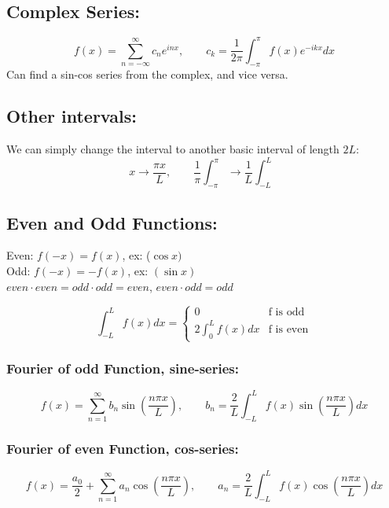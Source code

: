 \documentclass[a4paper,norsk, 10pt]{article}
\begin{document}
\subsection{Complex Series:}
\begin{equation}
f(x) = \sum_{n = -\infty}^{\infty}c_ne^{inx}, \qquad c_k = \frac{1}{2\pi}\int_{-\pi}^{\pi}f(x)e^{-ik x}dx
\end{equation}
Can find a sin-cos series from the complex, and vice versa.

\subsection{Other intervals:}
We can simply change the interval to another basic interval of length $2L$:
\begin{equation}
x\rightarrow \frac{\pi x}{L}, \qquad \frac{1}{\pi}\int_{-\pi}^{\pi} \rightarrow \frac{1}{L}\int_{-L}^{L}
\end{equation}
\subsection{Even and Odd Functions:}
Even: $f(-x) = f(x)$, ex: ($\cos x)$\\
Odd: $f(-x) = -f(x)$, ex: $(\sin x)$\\
$even\cdot even = odd\cdot odd = even$, $even\cdot odd = odd$

\begin{equation}
\int_{-L}^L f(x) dx = 
\begin{cases}
0 & \text{f is odd}\\
2\int_{0}^L f(x) dx & \text{f is even}
\end{cases}
\end{equation}

\subsubsection{Fourier of odd Function, sine-series:}
\begin{equation}
f(x) = \sum_{n = 1}^{\infty}b_n\sin\left(\frac{n\pi x}{L}\right), \qquad b_n = \frac{2}{L}\int_{-L}^L f(x)\sin\left(\frac{n\pi x}{L}\right) dx
\end{equation}

\subsubsection{Fourier of even Function, cos-series:}
\begin{equation}
f(x) = \frac{a_0}{2} + \sum_{n = 1}^{\infty}a_n\cos\left(\frac{n\pi x}{L}\right), \qquad a_n = \frac{2}{L}\int_{-L}^L f(x)\cos\left(\frac{n\pi x}{L}\right) dx
\end{equation}\\
\end{document}

